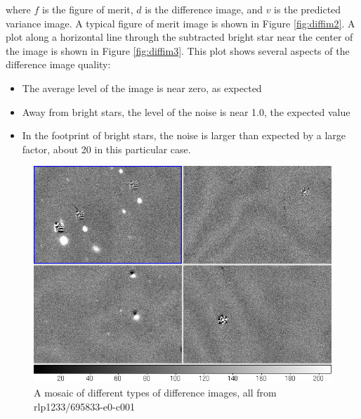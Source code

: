 where $f$ is the figure of merit, $d$ is the difference image, and $v$
is the predicted variance image.  A typical figure of merit image is
shown in Figure \ref{fig:diffim2}.  A plot along a horizontal line through
the subtracted bright star near the center of the image is shown in
Figure \ref{fig:diffim3}.  This plot shows several aspects of the difference
image quality:

\begin{itemize}
\item The average level of the image is near zero, as expected
\item Away from bright stars, the level of the noise is near 1.0, the
  expected value
\item In the footprint of bright stars, the noise is larger than
  expected by a large factor, about 20 in this particular case.
\end{itemize}  

\begin{figure}[htb]
\begin{center}
\includegraphics[width=6in]{images/rlp1233_v695833-e0-c001-mosaic.png}
\caption{A mosaic of different types of difference images, all from rlp1233/695833-e0-c001}  
\label{fig:diffim1}
\end{center}
\end{figure}

